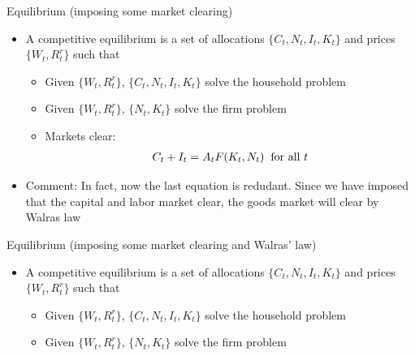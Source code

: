 \documentclass[9pt,xcolor={dvipsnames}]{beamer}
\newcommand{\bit}{\begin{itemize}}
\newcommand{\eit}{\end{itemize}}
\newcommand{\bc}{\color{blue}}
\begin{document}
\begin{frame}{Equilibrium (imposing some market clearing)}

\bit
\setlength\itemsep{1.5em}

\item A {\bc competitive equilibrium} is a set of allocations $\{C_t, N_t, I_t, K_t\}$ and prices $\{W_t, R^{r}_t\}$ such that
\bit
\setlength\itemsep{1em}
\item Given $\{W_t, R^{r}_t\}$, $\{C_t, N_t, I_t, K_t\}$ solve the household problem

\item Given $\{W_t, R^{r}_t\}$, $\{N_t, K_t\}$ solve the firm problem

\item Markets clear:
\begin{eqnarray}
C_t + I_t = A_t F(K_t, N_t) \hspace{2mm} \text{for all } t \nonumber
\end{eqnarray}
\eit

\item Comment: In fact, now the last equation is redudant. Since we have imposed that the capital and labor market clear, the goods market will clear by {\bc Walras law}

\eit

\end{frame}

\begin{frame}{Equilibrium (imposing some market clearing and Walras' law)}

\bit
\setlength\itemsep{1.5em}

\item A {\bc competitive equilibrium} is a set of allocations $\{C_t, N_t, I_t, K_t\}$ and prices $\{W_t, R^{r}_t\}$ such that
\bit
\setlength\itemsep{1em}
\item Given $\{W_t, R^{r}_t\}$, $\{C_t, N_t, I_t, K_t\}$ solve the household problem

\item Given $\{W_t, R^{r}_t\}$, $\{N_t, K_t\}$ solve the firm problem
\eit

\eit

\end{frame}
%
%
%
%	
%
%
%
%
%
\end{document}
